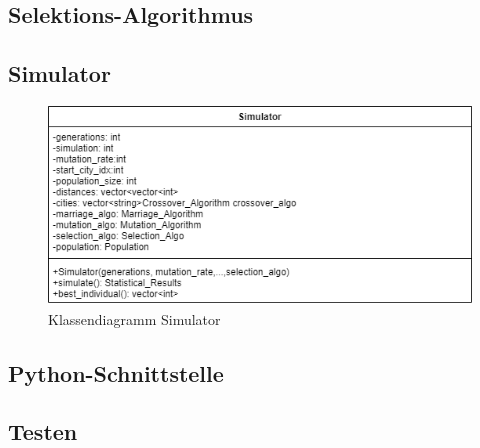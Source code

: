 \subsection{Selektions-Algorithmus}

\subsection{Simulator}

\begin{figure}[H]
\centering
\includegraphics[width=1\textwidth]{img/Vortrag/simulator.png}
\caption{Klassendiagramm Simulator}
\label{fig:simulator}
\end{figure}

\subsection{Python-Schnittstelle}

\subsection{Testen}

